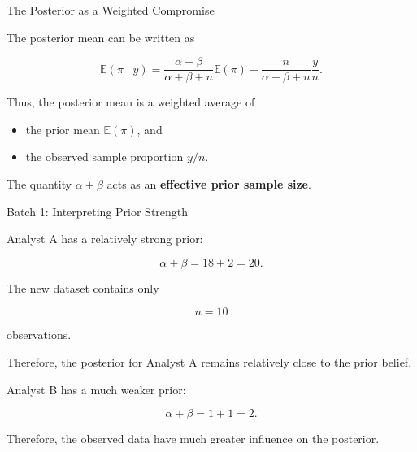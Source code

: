 \begin{frame}{The Posterior as a Weighted Compromise}

The posterior mean can be written as

\[
\mathbb{E}(\pi\mid y)
=
\frac{\alpha+\beta}
     {\alpha+\beta+n}
\mathbb{E}(\pi)
+
\frac{n}
     {\alpha+\beta+n}
\frac{y}{n}.
\]

\vspace{0.35cm}

Thus, the posterior mean is a weighted average of

\begin{itemize}
  \item the prior mean $\mathbb{E}(\pi)$, and
  \item the observed sample proportion $y/n$.
\end{itemize}

\vspace{0.25cm}

The quantity $\alpha+\beta$ acts as an
\textbf{effective prior sample size}.

\end{frame}

\begin{frame}{Batch 1: Interpreting Prior Strength}

Analyst A has a relatively strong prior:

\[
\alpha+\beta = 18+2 = 20.
\]

The new dataset contains only

\[
n=10
\]

observations.

\vspace{0.3cm}

Therefore, the posterior for Analyst A remains relatively close
to the prior belief.

\vspace{0.3cm}

Analyst B has a much weaker prior:

\[
\alpha+\beta = 1+1 = 2.
\]

Therefore, the observed data have much greater influence on the
posterior.

\end{frame}

